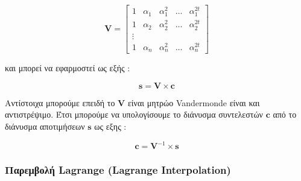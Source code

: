 $$
    \mathbf{V} = 
    \begin{bmatrix}
    1 & α_{1} & α_{1}^{2} & \ldots & α_{1}^{2 t} \\
    1 & α_{2} & α_{2}^{2} & \ldots & α_{2}^{2 t} \\
    \vdots & & & & \\
    1 & α_{n} & α_{n}^{2} & \ldots & α_{n}^{2 t}
    \end{bmatrix}
$$

και μπορεί να εφαρμοστεί ως εξής :

$$
     \mathbf{s} = \mathbf{V} \times \mathbf{c}
$$

Αντίστοιχα μπορούμε επειδή το $\mathbf{V}$ είναι μητρώο Vandermonde είναι και αντιστρέψιμο. Έτσι μπορούμε να υπολογίσουμε το διάνυσμα συντελεστών $\mathbf{c}$ από το διάνυσμα αποτιμήσεων $\mathbf{s}$ ως εξης :

$$
    \mathbf{c} = \mathbf{V}^{-1} \times \mathbf{s}
$$

\subsubsection{Παρεμβολή Lagrange (Lagrange Interpolation)}

